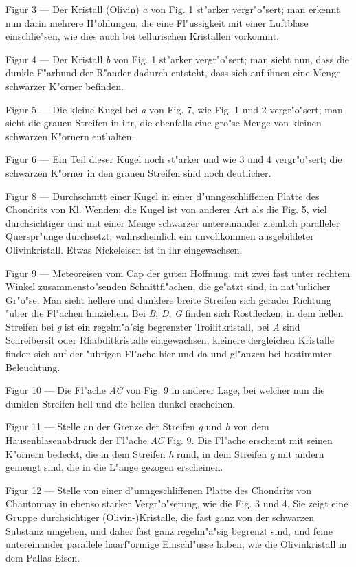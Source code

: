 \documentclass[a4paper, 11pt, oneside, german]{article}
\begin{document}
Figur 3 --- Der Kristall (Olivin) \emph{a} von Fig. 1 st"arker vergr"o"sert; man erkennt nun darin mehrere H"ohlungen, die eine Fl"ussigkeit mit einer Luftblase einschlie"sen, wie dies auch bei tellurischen Kristallen vorkommt.

Figur 4 --- Der Kristall \emph{b} von Fig. 1 st"arker vergr"o"sert; man sieht nun, dass die dunkle F"arbund der R"ander dadurch entsteht, dass sich auf ihnen eine Menge schwarzer K"orner befinden.

Figur 5 --- Die kleine Kugel bei \emph{a} von Fig. 7, wie Fig. 1 und 2 vergr"o"sert; man sieht die grauen Streifen in ihr, die ebenfalls eine gro"se Menge von kleinen schwarzen K"ornern enthalten.

Figur 6 --- Ein Teil dieser Kugel noch st"arker und wie 3 und 4 vergr"o"sert; die schwarzen K"orner in den grauen Streifen sind noch deutlicher.

Figur 8 --- Durchschnitt einer Kugel in einer d"unngeschliffenen Platte des Chondrits von Kl. Wenden; die Kugel ist von anderer Art als die Fig. 5, viel durchsichtiger und mit einer Menge schwarzer untereinander ziemlich paralleler Querspr"unge durchsetzt, wahrscheinlich ein unvollkommen ausgebildeter Olivinkristall. Etwas Nickeleisen ist in ihr eingewachsen.

Figur 9 --- Meteoreisen vom Cap der guten Hoffnung, mit zwei fast unter rechtem Winkel zusammensto"senden Schnittfl"achen, die ge"atzt sind, in nat"urlicher Gr"o"se. Man sieht hellere und dunklere breite Streifen sich gerader Richtung "uber die Fl"achen hinziehen. Bei \emph{B}, \emph{D}, \emph{G} finden sich Rostflecken; in dem hellen Streifen bei \emph{g} ist ein regelm"a"sig begrenzter Troilitkristall, bei \emph{A} sind Schreibersit oder Rhabditkristalle eingewachsen; kleinere dergleichen Kristalle finden sich auf der "ubrigen Fl"ache hier und da und gl"anzen bei bestimmter Beleuchtung.

Figur 10 --- Die Fl"ache \emph{AC} von Fig. 9 in anderer Lage, bei welcher nun die dunklen Streifen hell und die hellen dunkel erscheinen.

Figur 11 --- Stelle an der Grenze der Streifen \emph{g} und \emph{h} von dem Hausenblasenabdruck der Fl"ache \emph{AC} Fig. 9. Die Fl"ache erscheint mit seinen K"ornern bedeckt, die in dem Streifen \emph{h} rund, in dem Streifen \emph{g} mit andern gemengt sind, die in die L"ange gezogen erscheinen.

Figur 12 --- Stelle von einer d"unngeschliffenen Platte des Chondrits von Chantonnay in ebenso starker Vergr"o"serung, wie die Fig. 3 und 4. Sie zeigt eine Gruppe durchsichtiger (Olivin-)Kristalle, die fast ganz von der schwarzen Substanz umgeben, und daher fast ganz regelm"a"sig begrenzt sind, und feine untereinander parallele haarf"ormige Einschl"usse haben, wie die Olivinkristall in dem Pallas-Eisen.
\end{document}
